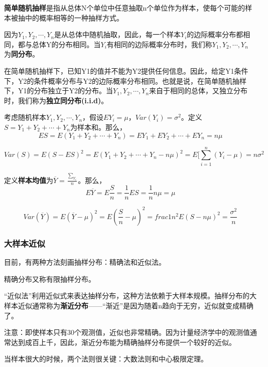 \documentclass[cn,10pt,math=newtx,citestyle=gb7714-2015,bibstyle=gb7714-2015]{elegantbook}
\begin{document}
	\textbf{简单随机抽样}是指从总体N个单位中任意抽取n个单位作为样本，使每个可能的样本被抽中的概率相等的一种抽样方式。
	
	因为$Y_1,Y_2,\cdots,Y_n$是从总体中随机抽取，因此，每一个样本$Y_i$的边际概率分布都相同，都与总体Y的分布相同。当$Y_i$有相同的边际概率分布时，我们称$Y_1,Y_2,\cdots,Y_n$ 为\textbf{同分布}。
	
	在简单随机抽样下，已知Y1的值并不能为Y2提供任何信息。因此，给定Y1条件下，Y2的条件概率分布与Y2的边际概率分布相同。也就是说，在简单随机抽样下，Y1的分布独立于Y2的分布。当$Y_1,Y_2,\cdots,Y_n$来自于相同的总体，又独立分布时，我们称为\textbf{独立同分布(i.i.d)}。
	
	考虑随机样本${Y_1,Y_2,\cdots,Y_n}$，假设$EY_i=\mu$，$Var(Y_i)=\sigma^2$。定义$S=Y_1+Y_2+\cdots+Y_n$为样本和。那么，
	\begin{equation}
		ES=E(Y_1+Y_2+\cdots+Y_n)=EY_1+EY_2+\cdots+EY_n=n\mu
	\end{equation}
	
	\begin{equation}
		Var(S)=E(S-ES)^2=E(Y_1+Y_2+\cdots+Y_n-n\mu)^2=E[\sum_{i=1}^n{(Y_i-\mu)}=n\sigma^2
	\end{equation}
	
	定义\textbf{样本均值}为$\overline{Y}=\frac{\sum_{Y_i}}{n}$。那么，
	\begin{equation}
		E\overline{Y}=E\frac{S}{n}=\frac{1}{n}ES=\frac{1}{n}n\mu=\mu
	\end{equation}
	
	\begin{equation}
		Var(\overline{Y})=E(\overline{Y}-\mu)^2=E(\frac{S}{n}-\mu)^2=frac{1}{n^2}E(S-n\mu)^2=\frac{\sigma^2}{n}
	\end{equation}
	
	\subsubsection{大样本近似}
	目前，有两种方法刻画抽样分布：精确法和近似法。
	
	精确分布又称有限抽样分布。
	
	“近似法”利用近似式来表达抽样分布，这种方法依赖于大样本规模。抽样分布的大样本近似通常称为\textbf{渐近分布}——“渐近”是因为随着n趋向于无穷，近似就变成精确了。
	
	注意：即使样本只有30个观测值，近似也非常精确。因为计量经济学中的观测值通常达到成百上千，因此，渐近分布能为精确抽样分布提供一个较好的近似。
	
	当样本很大的时候，两个法则很关键：大数法则和中心极限定理。
	
\end{document}
